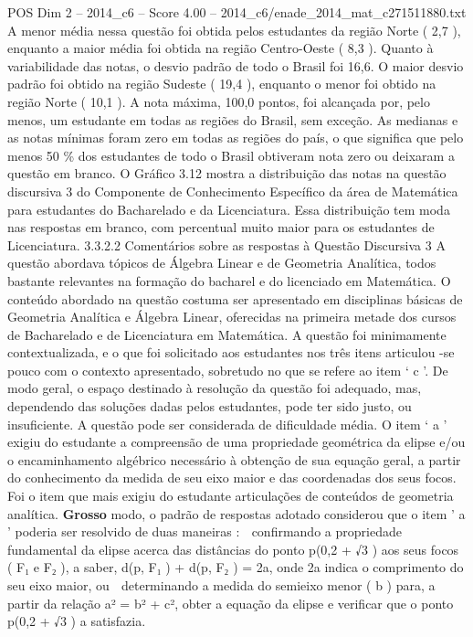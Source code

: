 \begin{textsample}{POS Dim 2 – 2014\_c6 – Score 4.00 – 2014\_c6/enade\_2014\_mat\_c271511880.txt}
A menor média nessa questão foi obtida pelos estudantes da região Norte ( 2,7 ), enquanto a maior média foi obtida na região Centro-Oeste ( 8,3 ).
Quanto à variabilidade das notas, o desvio padrão de todo o Brasil foi 16,6.
O maior desvio padrão foi obtido na região Sudeste ( 19,4 ), enquanto o menor foi obtido na região Norte ( 10,1 ).
A nota máxima, 100,0 pontos, foi alcançada por, pelo menos, um estudante em todas as regiões do Brasil, sem exceção.
As medianas e as notas mínimas foram zero em todas as regiões do país, o que significa que pelo menos 50 \% dos estudantes de todo o Brasil obtiveram nota zero ou deixaram a questão em branco.
O Gráfico 3.12 mostra a distribuição das notas na questão discursiva 3 do Componente de Conhecimento Específico da área de Matemática para estudantes do Bacharelado e da Licenciatura.
Essa distribuição tem moda nas respostas em branco, com percentual muito maior para os estudantes de Licenciatura. 3.3.2.2 Comentários sobre as respostas à Questão Discursiva 3 A questão abordava tópicos de Álgebra Linear e de Geometria Analítica, todos bastante relevantes na formação do bacharel e do licenciado em Matemática.
O conteúdo abordado na questão costuma ser apresentado em disciplinas básicas de Geometria Analítica e Álgebra Linear, oferecidas na primeira metade dos cursos de Bacharelado e de Licenciatura em Matemática.
A questão foi minimamente contextualizada, e o que foi solicitado aos estudantes nos três itens articulou -se pouco com o contexto apresentado, sobretudo no que se refere ao item ‘ c ’.
De modo geral, o espaço destinado à resolução da questão foi adequado, mas, dependendo das soluções dadas pelos estudantes, pode ter sido justo, ou insuficiente.
A questão pode ser considerada de dificuldade média.
O item ‘ a ’ exigiu do estudante a compreensão de uma propriedade geométrica da elipse e/ou o encaminhamento algébrico necessário à obtenção de sua equação geral, a partir do conhecimento da medida de seu eixo maior e das coordenadas dos seus focos.
Foi o item que mais exigiu do estudante articulações de conteúdos de geometria analítica. \textbf{Grosso} modo, o padrão de respostas adotado considerou que o item ’ a ’ poderia ser resolvido de duas maneiras :  confirmando a propriedade fundamental da elipse acerca das distâncias do ponto p(0,2 + √3 ) aos seus focos ( F₁ e F₂ ), a saber, d(p, F₁ ) + d(p, F₂ ) = 2a, onde 2a indica o comprimento do seu eixo maior, ou  determinando a medida do semieixo menor ( b ) para, a partir da relação a² = b² + c², obter a equação da elipse e verificar que o ponto p(0,2 + √3 ) a satisfazia.

\end{textsample}
